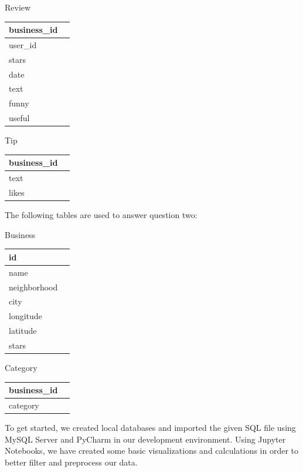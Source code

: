 \documentclass{neu_handout}
\begin{document}
\begin{center}
Review\\
\begin{tabular}{|l|l|}
\hline
business\_id  \\ \hline
user\_id  \\ \hline
stars  \\ \hline
date  \\ \hline
text  \\ \hline
funny  \\ \hline
useful  \\ \hline
\end{tabular}
\end{center}

\begin{center}
Tip\\
\begin{tabular}{|l|l|}
\hline
business\_id  \\ \hline
text  \\ \hline
likes  \\ \hline
\end{tabular}
\end{center}

The following tables are used to answer question two:

\begin{center}
Business\\
\begin{tabular}{|l|l|}
\hline
id  \\ \hline
name  \\ \hline
neighborhood  \\ \hline
city  \\ \hline
longitude  \\ \hline
latitude  \\ \hline
stars  \\ \hline
\end{tabular}
\end{center}

\begin{center}
Category\\
\begin{tabular}{|l|l|}
\hline
business\_id  \\ \hline
category  \\ \hline
\end{tabular}
\end{center}


To get started, we created local databases and imported the given SQL file using MySQL Server and PyCharm in our development environment. Using Jupyter Notebooks, we have created some basic visualizations and calculations in order to better filter and preprocess our data.
\end{document}
